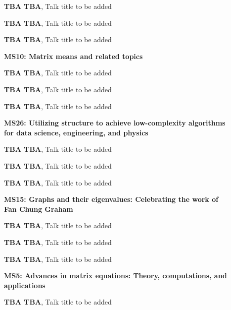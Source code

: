 \documentclass[ILAS2025-program.tex]{subfiles}
\begin{document}
\begin{description}
\begin{description}
    \item[] \textbf{TBA TBA}, Talk title to be added
        \item[] \textbf{TBA TBA}, Talk title to be added
        \item[] \textbf{TBA TBA}, Talk title to be added
        \end{description}
    \begin{description}
    \item[] \textbf{MS10: Matrix means and related topics} 
    \item[] \textbf{TBA TBA}, Talk title to be added
        \item[] \textbf{TBA TBA}, Talk title to be added
        \item[] \textbf{TBA TBA}, Talk title to be added
        \end{description}
    \begin{description}
    \item[] \textbf{MS26: Utilizing structure to achieve low-complexity algorithms for data science, engineering, and physics} 
    \item[] \textbf{TBA TBA}, Talk title to be added
        \item[] \textbf{TBA TBA}, Talk title to be added
        \item[] \textbf{TBA TBA}, Talk title to be added
        \end{description}
    \begin{description}
    \item[] \textbf{MS15: Graphs and their eigenvalues: Celebrating the work of Fan Chung Graham} 
    \item[] \textbf{TBA TBA}, Talk title to be added
        \item[] \textbf{TBA TBA}, Talk title to be added
        \item[] \textbf{TBA TBA}, Talk title to be added
        \end{description}
    \begin{description}
    \item[] \textbf{MS5: Advances in matrix equations: Theory, computations, and applications} 
    \item[] \textbf{TBA TBA}, Talk title to be added

\end{description}
\end{description}
\end{document}

